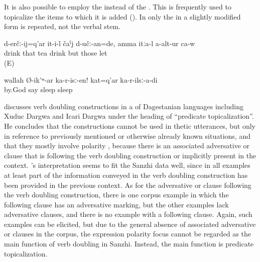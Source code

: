 It is also possible to employ the   instead of the . This  is frequently used to topicalize the items to which it is added (). In  only the  in a slightly modified form is repeated, not the verbal stem.
%
\begin{exe}
	\ex	\label{ex:‎As for drinking, he would have drunk the tea, but they did not let him}
	\gll	d-erčː-ij=q'ar	it-i-l	čaˁj	d-učː-an=de,	amma	itːa-l	a-alt-ur	ca-w\\
		drink	that	tea	drink	but	those	let	\\
	\glt	{} (E)
	
		\ex	\label{ex:By God, he says, lay down (in the hospital)}
	\gll	wallah	Ø-ik'ʷ-ar		ka-r-isː-en!	kat=q'ar	ka-r-ilsː-a-di\\
		by.God	say		sleep 	sleep\\
	\glt	{}
	
\end{exe}

\citet{Maisak2010} discusses verb doubling constructions in a  of Dagestanian languages including Xuduc Dargwa and Icari Dargwa under the heading of ``predicate topicalization''. He concludes that the constructions cannot be used in thetic utterances, but only in reference to previously mentioned or otherwise already known situations, and that they mostly involve polarity , because there is an associated adversative or  clause that is following the verb doubling construction or implicitly present in the context. 's interpretation seems to fit the Sanzhi data well, since in all examples at least part of the information conveyed in the verb doubling construction has been provided in the previous context. As for the adversative or  clause following the verb doubling construction, there is one corpus example in which the following clause has an adversative  marking, but the other examples  lack adversative clauses, and there is no example with a following  clause. Again, such examples can be elicited, but due to the general absence of associated adversative or  clauses in the corpus, the expression polarity focus cannot be regarded as the main function of verb doubling in Sanzhi. Instead, the main function is predicate topicalization.


